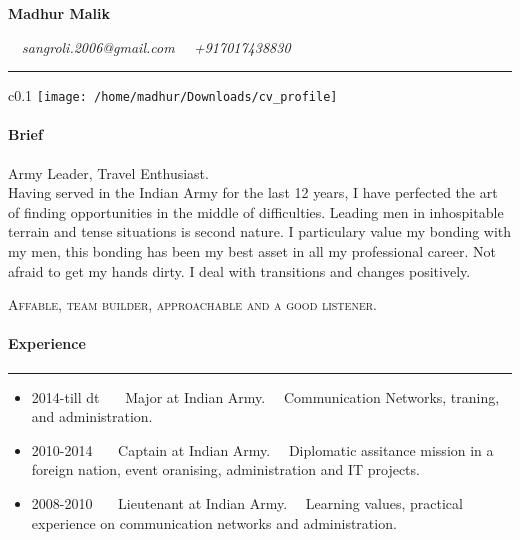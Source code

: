 \documentclass[12pt]{article}
\begin{document}
\Large \textbf{ \sc Madhur Malik} \raggedright\ \ 
\small \textit {sangroli.2006@gmail.com \ \ +917017438830}\\

\rule {15cm}{2pt}


\begin{wrapfigure}{c}{0.1 \textwidth}
\centering
\texttt{[image: /home/madhur/Downloads/cv\_profile]}

\end{wrapfigure}


 \paragraph{Brief} 
 Army Leader, Travel Enthusiast.\\
Having served in the Indian Army for the last 12 years, I have perfected the art of finding opportunities in the middle of difficulties. Leading men in inhospitable terrain and tense situations is second nature. I particulary value my bonding with my men, this bonding has been my best asset in all my professional career. Not afraid to get my hands dirty. I deal with transitions and changes positively. \\ 
\vspace{2mm}
\par 
\textsc{Affable, team builder, approachable and  a good listener.} 

\paragraph{Experience}
\rule {12.5cm}{2pt} \vspace{2mm}

\begin{itemize}
	\item 2014-till dt \ \  \ Major at Indian Army. \ \ Communication Networks, traning, and administration.\\
	
	\item 2010-2014 \ \ \ Captain at Indian Army. \ \ Diplomatic assitance mission in a foreign nation, event oranising, administration and IT projects.
	\item 2008-2010 \ \ \ Lieutenant at Indian Army. \ \ Learning values, practical experience on communication networks and administration.
\end{itemize}
\end{document}
